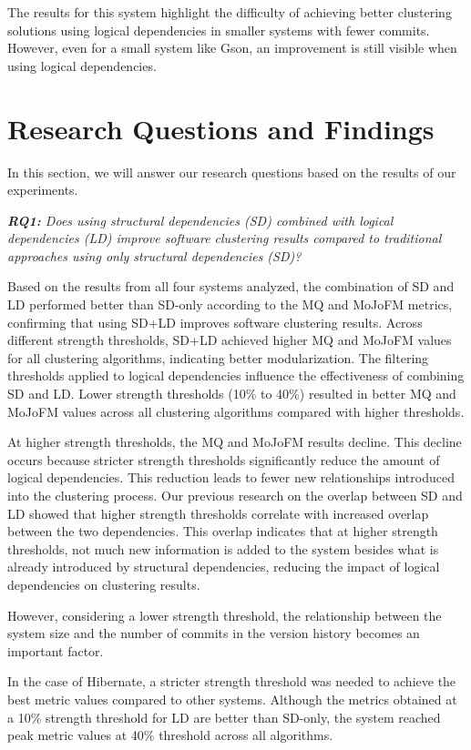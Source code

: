 \documentclass{ieeeaccess}
\begin{document}
The results for this system highlight the difficulty of achieving better clustering solutions using logical dependencies in smaller systems with fewer commits. However, even for a small system like Gson, an improvement is still visible when using logical dependencies.



\section{Research Questions and Findings}
\label{sec:rq}

In this section, we will answer our research questions based on the results of our experiments. 

\textit{ \textbf{RQ1:} Does using structural dependencies (SD) combined with logical dependencies (LD) improve software clustering results compared to traditional approaches using only structural dependencies (SD)?} 

Based on the results from all four systems analyzed, the combination of SD and LD performed better than SD-only according to the MQ and MoJoFM metrics, confirming that using SD+LD improves software clustering results. Across different strength thresholds, SD+LD achieved higher MQ and MoJoFM values for all clustering algorithms, indicating better modularization. 
The filtering thresholds applied to logical dependencies influence the effectiveness of combining SD and LD. Lower strength thresholds (10\% to 40\%) resulted in better MQ and MoJoFM values across all clustering algorithms compared with higher thresholds.

At higher strength thresholds, the MQ and MoJoFM results decline. This decline occurs because stricter strength thresholds significantly reduce the amount of logical dependencies. This reduction leads to fewer new relationships introduced into the clustering process. Our previous research on the overlap between SD and LD showed that higher strength thresholds correlate with increased overlap between the two dependencies. This overlap indicates that at higher strength thresholds, not much new information is added to the system besides what is already introduced by structural dependencies, reducing the impact of logical dependencies on clustering results.

However, considering a lower strength threshold, the relationship between the system size and the number of commits in the version history becomes an important factor.

In the case of Hibernate, a stricter strength threshold was needed to achieve the best metric values compared to other systems. Although the metrics obtained at a 10\% strength threshold for LD are better than SD-only, the system reached peak metric values at 40\% threshold across all algorithms.
\end{document}
